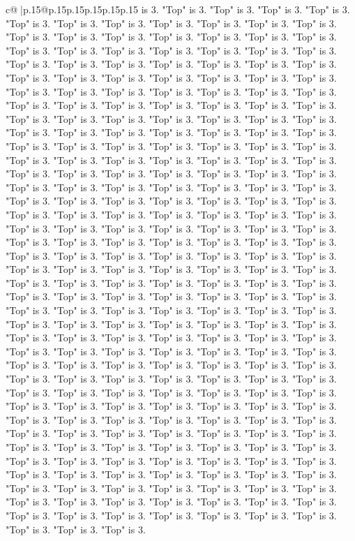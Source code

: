 \documentclass{article}
\begin{document}
{\begin{supertabular}{c@{$\;$}|p{.15\linewidth}@{}p{.15\linewidth}p{.15\linewidth}p{.15\linewidth}p{.15\linewidth}p{.15\linewidth}}
{{{is 3. "Top" is 3. "Top" is 3. "Top" is 3. "Top" is 3. "Top" is 3. "Top" is 3. "Top" is 3. "Top" is 3. "Top" is 3. "Top" is 3. "Top" is 3. "Top" is 3. "Top" is 3. "Top" is 3. "Top" is 3. "Top" is 3. "Top" is 3. "Top" is 3. "Top" is 3. "Top" is 3. "Top" is 3. "Top" is 3. "Top" is 3. "Top" is 3. "Top" is 3. "Top" is 3. "Top" is 3. "Top" is 3. "Top" is 3. "Top" is 3. "Top" is 3. "Top" is 3. "Top" is 3. "Top" is 3. "Top" is 3. "Top" is 3. "Top" is 3. "Top" is 3. "Top" is 3. "Top" is 3. "Top" is 3. "Top" is 3. "Top" is 3. "Top" is 3. "Top" is 3. "Top" is 3. "Top" is 3. "Top" is 3. "Top" is 3. "Top" is 3. "Top" is 3. "Top" is 3. "Top" is 3. "Top" is 3. "Top" is 3. "Top" is 3. "Top" is 3. "Top" is 3. "Top" is 3. "Top" is 3. "Top" is 3. "Top" is 3. "Top" is 3. "Top" is 3. "Top" is 3. "Top" is 3. "Top" is 3. "Top" is 3. "Top" is 3. "Top" is 3. "Top" is 3. "Top" is 3. "Top" is 3. "Top" is 3. "Top" is 3. "Top" is 3. "Top" is 3. "Top" is 3. "Top" is 3. "Top" is 3. "Top" is 3. "Top" is 3. "Top" is 3. "Top" is 3. "Top" is 3. "Top" is 3. "Top" is 3. "Top" is 3. "Top" is 3. "Top" is 3. "Top" is 3. "Top" is 3. "Top" is 3. "Top" is 3. "Top" is 3. "Top" is 3. "Top" is 3. "Top" is 3. "Top" is 3. "Top" is 3. "Top" is 3. "Top" is 3. "Top" is 3. "Top" is 3. "Top" is 3. "Top" is 3. "Top" is 3. "Top" is 3. "Top" is 3. "Top" is 3. "Top" is 3. "Top" is 3. "Top" is 3. "Top" is 3. "Top" is 3. "Top" is 3. "Top" is 3. "Top" is 3. "Top" is 3. "Top" is 3. "Top" is 3. "Top" is 3. "Top" is 3. "Top" is 3. "Top" is 3. "Top" is 3. "Top" is 3. "Top" is 3. "Top" is 3. "Top" is 3. "Top" is 3. "Top" is 3. "Top" is 3. "Top" is 3. "Top" is 3. "Top" is 3. "Top" is 3. "Top" is 3. "Top" is 3. "Top" is 3. "Top" is 3. "Top" is 3. "Top" is 3. "Top" is 3. "Top" is 3. "Top" is 3. "Top" is 3. "Top" is 3. "Top" is 3. "Top" is 3. "Top" is 3. "Top" is 3. "Top" is 3. "Top" is 3. "Top" is 3. "Top" is 3. "Top" is 3. "Top" is 3. "Top" is 3. "Top" is 3. "Top" is 3. "Top" is 3. "Top" is 3. "Top" is 3. "Top" is 3. "Top" is 3. "Top" is 3. "Top" is 3. "Top" is 3. "Top" is 3. "Top" is 3. "Top" is 3. "Top" is 3. "Top" is 3. "Top" is 3. "Top" is 3. "Top" is 3. "Top" is 3. "Top" is 3. "Top" is 3. "Top" is 3. "Top" is 3. "Top" is 3. "Top" is 3. "Top" is 3. "Top" is 3. "Top" is 3. "Top" is 3. "Top" is 3. "Top" is 3. "Top" is 3. "Top" is 3. "Top" is 3. "Top" is 3. "Top" is 3. "Top" is 3. "Top" is 3. "Top" is 3. "Top" is 3. "Top" is 3. "Top" is 3. "Top" is 3. "Top" is 3. "Top" is 3. "Top" is 3. "Top" is 3. "Top" is 3. "Top" is 3. "Top" is 3. "Top" is 3. "Top" is 3. "Top" is 3. "Top" is 3. "Top" is 3. "Top" is 3. "Top" is 3. "Top" is 3. "Top" is 3. "Top" is 3. "Top" is 3. "Top" is 3. "Top" is 3. "Top" is 3. "Top" is 3. "Top" is 3. "Top" is 3. "Top" is 3. "Top" is 3. "Top" is 3. "Top" is 3. "Top" is 3. "Top" is 3. "Top" is 3. "Top" is 3. "Top" is 3. "Top" is 3. "Top" is 3. "Top" is 3. "Top" is 3. "Top" is 3. "Top" is 3. "Top" is 3. "Top" is 3. "Top" is 3. "Top" is 3. "Top" is 3. "Top" is 3. "Top" is 3. "Top" is 3. "Top" is 3. "Top" is 3. "Top" is 3. "Top" is 3. "Top" is 3. "Top" is 3. "Top" is 3. "Top" is 3. "Top" is 3. "Top" is 3. "Top" is 3. "Top" is 3. "Top" is 3. "Top" is 3. "Top" is 3. "Top" is 3. "Top" is 3. }}}
\end{supertabular}}
\end{document}
